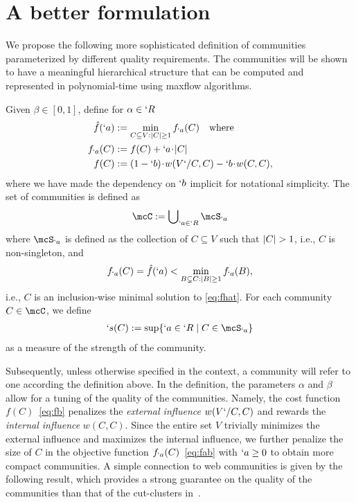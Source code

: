 \section{A better formulation}
\label{sec:problem}
 
We propose the following more sophisticated definition of communities parameterized by different quality requirements. The communities will be shown to have a meaningful hierarchical structure that can be computed and represented in polynomial-time using maxflow algorithms.

\begin{definition}
  \label{def:alpha-beta}
  Given $\beta\in [0,1]$, define for $\alpha\in `R$
        \begin{subequations}
          \label{eq:alpha-beta-community}
          \begin{align}
            \hat{f}(`a)&:=\min_{C\subseteq V:\lvert C\rvert\geq 1} f_{`a}(C) \quad \text{where}\label{eq:fhat}\\
            f_{`a}(C)&:=f(C) + `a \!\cdot\! |C| \label{eq:fab}\\
            f(C)&:=(1-`b)\!\cdot\! w(V`/ C, C) - `b \!\cdot\! w(C,C),\label{eq:fb}
          \end{align}
        \end{subequations}
        where we have made the dependency on $`b$ implicit for notational simplicity. The set of communities is defined as
        \begin{align}
          \mcC := \bigcup\nolimits_{`a\in `R} \mcS_{`a}\label{eq:mcC}
        \end{align}
        where $\mcS_{`a}$ is defined as the collection of $C\subseteq V$ such that $\lvert C\rvert>1$, i.e., $C$ is non-singleton, and
        \begin{align}
          f_{`a}(C)=\hat{f}(`a)< \min_{B\subsetneq C:\lvert B\rvert\geq 1} f_{`a}(B),\label{eq:mcS}
        \end{align}
        i.e., $C$ is an inclusion-wise minimal solution to \eqref{eq:fhat}. For each community $C\in \mcC$, we define
        \begin{align}
          `s(C) := \sup\Set*{`a\in `R \mid C\in \mcS_{`a}}\label{eq:`s}
        \end{align}
        as a measure of the strength of the community.
\end{definition}

Subsequently, unless otherwise specified in the context, a community will refer to one according
the definition above. 
In the definition,
the parameters $\alpha$ and $\beta$ allow for a tuning of the quality of the communities.
Namely, the cost function $f(C)$~\eqref{eq:fb} penalizes the \emph{external influence}
$w(V`/ C, C)$ and rewards the \emph{internal influence} $w(C,C)$. Since the entire set $V$
trivially minimizes the external influence and maximizes the internal influence, we further penalize the
size of $C$ in the objective function $f_{`a}(C)$~\eqref{eq:fab} with $`a\geq 0$ to obtain more compact
communities. A simple connection to web communities is given by the following result, which provides a strong guarantee on the quality of the communities than that of the cut-clusters in~\cite[Lemma~3.1]{flake:cut-clustering}.


